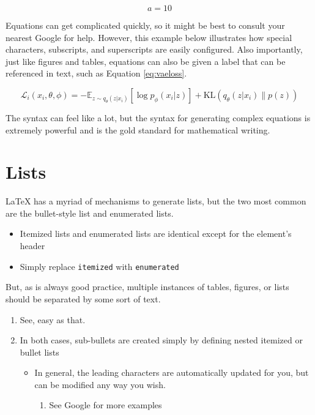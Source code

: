 \begin{equation}
\label{eq:a}
a = 10
\end{equation}

Equations can get complicated quickly, so it might be best to consult your nearest Google for help. However, this example below illustrates how special characters, subscripts, and superscripts are easily configured.
Also importantly, just like figures and tables, equations can also be given a label that can be referenced in text, such as Equation \ref{eq:vaeloss}.

\begin{equation} 
\label{eq:vaeloss}
\mathcal{L}_i(x_i, \theta, \phi) = -\mathbb{E}_{z\sim q_\theta(z|x_i)}[\log p_\phi (x_i | z)] + \text{KL}(q_\theta(z|x_i)\|p(z))
\end{equation}

The syntax can feel like a lot, but the syntax for generating complex equations is extremely powerful and is the gold standard for mathematical writing. 

\section{Lists}

LaTeX has a myriad of mechanisms to generate lists, but the two most common are the bullet-style list and enumerated lists.

\begin{itemize}
\item Itemized lists and enumerated lists are identical except for the element's header
\item Simply replace \texttt{itemized} with \texttt{enumerated}
\end{itemize}

But, as is always good practice, multiple instances of tables, figures, or lists should be separated by some sort of text.

\begin{enumerate}
\item See, easy as that.
\item In both cases, sub-bullets are created simply by defining nested itemized or bullet lists
\begin{itemize}
\item In general, the leading characters are automatically updated for you, but can be modified any way you wish.
\begin{enumerate}
\item See Google for more examples
\end{enumerate}
\end{itemize}
\end{enumerate}


